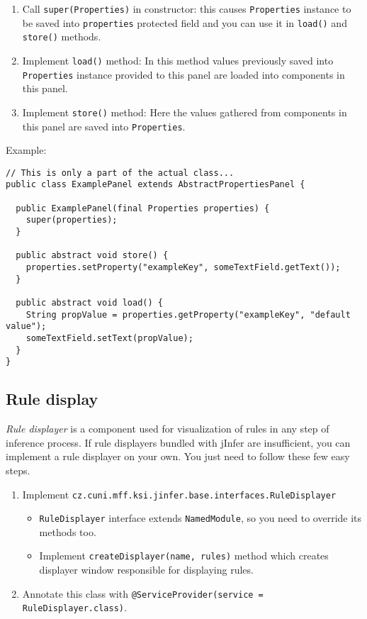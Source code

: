 \documentclass[a4paper,10pt,oneside]{article}
\begin{document}
\begin{enumerate}
  \item 
    Call \texttt{super(Properties)} in constructor: this causes
    \texttt{Properties} instance to be saved into
    \texttt{properties} protected field and you can use it in
    \texttt{load()} and \texttt{store()} methods.
  
  \item 
    Implement \texttt{load()} method: In this method values previously saved
    into \texttt{Properties} instance provided to this panel are loaded into
    components in this panel.
  
  \item 
    Implement \texttt{store()} method: Here the values gathered from
    components in this panel are saved into \texttt{Properties}.
  
\end{enumerate}

Example:
\begin{verbatim}
// This is only a part of the actual class...
public class ExamplePanel extends AbstractPropertiesPanel {

  public ExamplePanel(final Properties properties) {
    super(properties);
  }

  public abstract void store() {
    properties.setProperty("exampleKey", someTextField.getText());
  }

  public abstract void load() {
    String propValue = properties.getProperty("exampleKey", "default value");
    someTextField.setText(propValue);
  }
}
\end{verbatim}

\subsection*{Rule display}

\par 
  \textit{Rule displayer} is a component used for visualization of rules in any
  step of inference process. If rule displayers bundled with jInfer are
  insufficient, you can implement a rule displayer on your own.
  You just need to follow these few easy steps.

\begin{enumerate}
  \item 
    Implement \texttt{cz.cuni.mff.ksi.jinfer.base.interfaces.RuleDisplayer}
    \begin{itemize}
      \item 
        \texttt{RuleDisplayer} interface extends \texttt{NamedModule},
        so you need to override its methods too.
      
      \item 
        Implement \texttt{createDisplayer(name, rules)} method which creates
        displayer window responsible for displaying rules.
      
    \end{itemize}
  
  \item 
    Annotate this class with
    \texttt{@ServiceProvider(service = RuleDisplayer.class)}.
  
\end{enumerate}
\end{document}

